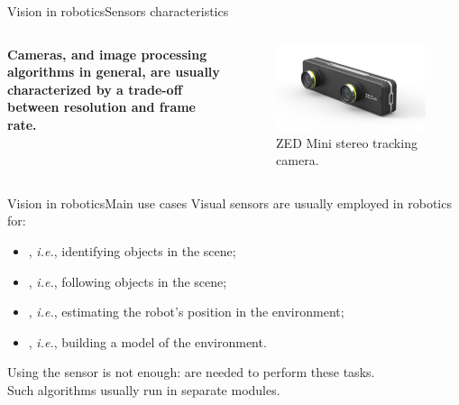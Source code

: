 \begin{frame}{Vision in robotics}{Sensors characteristics}
	\begin{columns}
		\begin{block}{}
			\centering
			\textbf{Cameras, and image processing algorithms in general, are usually characterized by a trade-off between resolution and frame rate.}
		\end{block}

		\begin{figure}
			\centering
			\includegraphics[width=\textwidth]{zedm}
			\caption{ZED Mini stereo tracking camera.}
			\label{fig:zedm}
		\end{figure}
	\end{columns}
\end{frame}
\begin{frame}{Vision in robotics}{Main use cases}
	Visual sensors are usually employed in robotics for:
	\begin{itemize}
		\item {}, \emph{i.e.}, identifying objects in the scene;
		\item {}, \emph{i.e.}, following objects in the scene;
		\item {}, \emph{i.e.}, estimating the robot's position in the environment;
		\item {}, \emph{i.e.}, building a model of the environment.
	\end{itemize}
	\vspace{.5cm}
	Using the sensor is not enough:  are needed to perform these tasks.\\
	Such algorithms usually run in separate modules.
\end{frame}

